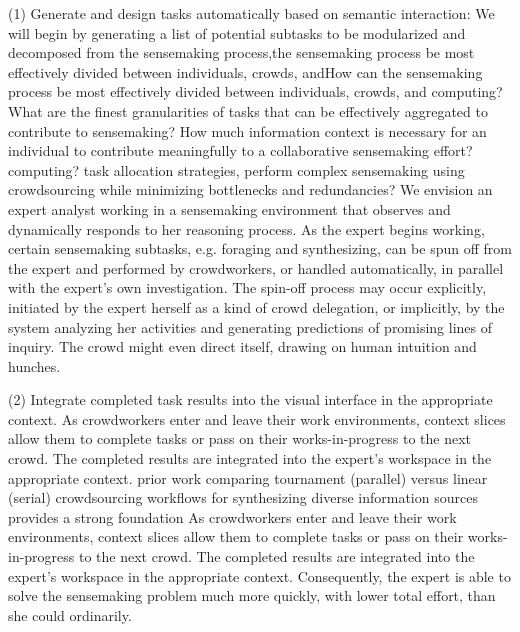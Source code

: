 \documentclass[journal]{vgtc}                %
\begin{document}
(1) Generate and design tasks automatically based on semantic interaction: We will begin by generating a list of potential subtasks to be modularized and decomposed from the sensemaking process,the sensemaking process be most effectively divided between individuals, crowds, andHow can the sensemaking process be most effectively divided between individuals, crowds, and computing? What are the finest granularities of tasks that can be effectively aggregated to contribute to sensemaking? How much information context is necessary for an individual to contribute meaningfully to a collaborative sensemaking effort? computing? task allocation strategies, perform complex sensemaking using crowdsourcing while minimizing bottlenecks and redundancies?
We envision an expert analyst working in a sensemaking environment that observes and dynamically responds to her reasoning process.
As the expert begins working, certain sensemaking subtasks, e.g. foraging and synthesizing, can be spun off from the expert and performed by crowdworkers, or handled automatically, in parallel with the expert’s own investigation.
The spin-off process may occur explicitly, initiated by the expert herself as a kind of crowd delegation, or implicitly, by the system analyzing her activities and generating predictions of promising lines of inquiry.
The crowd might even direct itself, drawing on human intuition and hunches.

(2) Integrate completed task results into the visual interface in the appropriate context.
As crowdworkers enter and leave their work environments, context slices allow them to complete tasks or pass on their works-in-progress to the next crowd. The completed results are integrated into the expert’s workspace in the appropriate context.
prior work comparing tournament (parallel) versus linear (serial) crowdsourcing workflows for synthesizing diverse information sources provides a strong foundation
As crowdworkers enter and leave their work environments, context slices allow them to complete tasks or pass on their works-in-progress to the next crowd.
The completed results are integrated into the expert’s workspace in the appropriate context.
Consequently, the expert is able to solve the sensemaking problem much more quickly, with lower total effort, than she could ordinarily.
\end{document}
